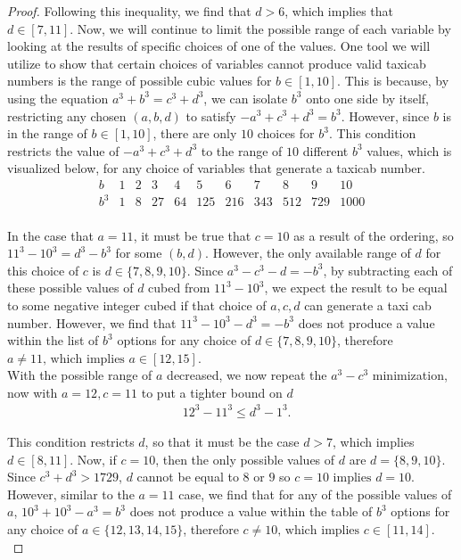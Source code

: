 \documentclass[12pt]{amsart}
\theoremstyle{definition}
\theoremstyle{remark}
\begin{document}
\begin{proof}
 Following this inequality, we find that $d>6$, which implies that $d\in[7,11]$. Now, we will continue to limit the possible range of each variable by looking at the results of specific choices of one of the values. One tool we will utilize to show that certain choices of variables cannot produce valid taxicab numbers is the range of possible cubic values for $b \in [1,10]$. This is because, by using the equation $a^3+b^3=c^3+d^3$, we can isolate $b^3$ onto one side by itself, restricting any chosen $(a,b,d)$ to satisfy $-a^3+c^3+d^3=b^3$. However, since $b$ is in the range of $ b \in[1,10]$, there are only $10$ choices for $b^3$. This condition restricts the value of $-a^3+c^3+d^3$ to the range of $10$ different $b^3$ values, which is visualized below, for any choice of variables that generate a taxicab number. 
 \[
 \begin{array}{c|cccccccccc}
b & 1 & 2 & 3 & 4 & 5 & 6 & 7 & 8 & 9 & 10  \\
\hline
b^3 & 1 & 8 & 27  & 64 & 125 & 216 & 343 & 512 & 729 & 1000   \\

\end{array}
\]
 
 In the case that $a=11$, it must be true that $c=10$ as a result of the ordering, so $11^3-10^3 = d^3-b^3$ for some $(b,d)$. However, the only available range of $d$ for this choice of $c$ is $d\in\{7,8,9,10\}$. Since $a^3-c^3-d=-b^3$, by subtracting each of these possible values of $d$ cubed from $11^3-10^3$, we expect the result to be equal to some negative integer cubed if that choice of $a,c,d$ can generate a taxi cab number. However, we find that $11^3-10^3 - d^3=-b^3$ does not produce a value within the list of $b^3$ options for any choice of $d \in \{7,8,9,10\}$, therefore $a\neq 11 \text{, which implies } a\in[12,15]$.\\

 With the possible range of $a$ decreased, we now repeat the $a^3-c^3$ minimization, now with $a=12,c=11$ to put a tighter bound on $d$
 \begin{align*}
     &12^3-11^3 \leq d^3-1^3 .
 \end{align*}

This condition restricts $d$, so that it must be the case $d>7$, which implies $d\in [8,11]$. Now, if $c=10$, then the only possible values of $d$ are $d= \{8,9,10\}$. Since $c^3+d^3>1729$, $d$ cannot be equal to $8$ or $9$ so $c=10 \text{ implies } d=10$. However, similar to the $a=11$ case, we find that for any of the possible values of $a$, $10^3+10^3-a^3=b^3$ does not produce a value within the table of $b^3$ options for any choice of $a \in \{12,13,14,15\}$, therefore $c\neq 10 \text{, which implies } c\in[11,14]$.\\


\end{proof}
\end{document}
